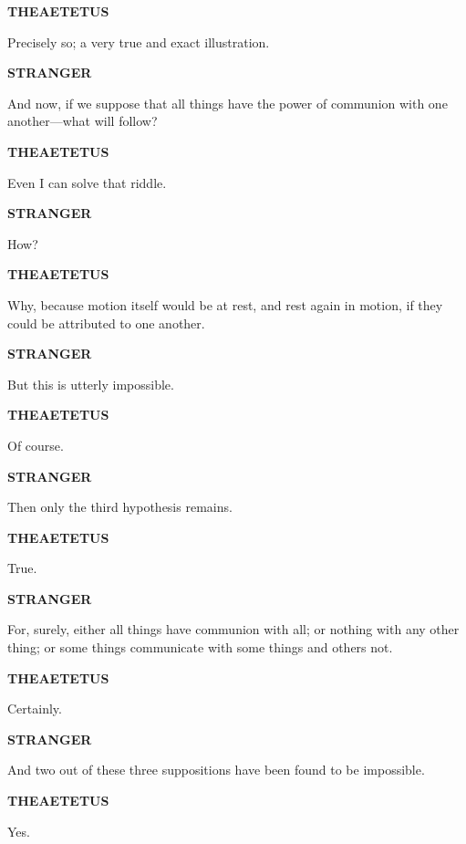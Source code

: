 \documentclass[11pt,letter]{article}
\begin{document}
\par \textbf{THEAETETUS}
\par   Precisely so; a very true and exact illustration.

\par \textbf{STRANGER}
\par   And now, if we suppose that all things have the power of communion with one another—what will follow?

\par \textbf{THEAETETUS}
\par   Even I can solve that riddle.

\par \textbf{STRANGER}
\par   How?

\par \textbf{THEAETETUS}
\par   Why, because motion itself would be at rest, and rest again in motion, if they could be attributed to one another.

\par \textbf{STRANGER}
\par   But this is utterly impossible.

\par \textbf{THEAETETUS}
\par   Of course.

\par \textbf{STRANGER}
\par   Then only the third hypothesis remains.

\par \textbf{THEAETETUS}
\par   True.

\par \textbf{STRANGER}
\par   For, surely, either all things have communion with all; or nothing with any other thing; or some things communicate with some things and others not.

\par \textbf{THEAETETUS}
\par   Certainly.

\par \textbf{STRANGER}
\par   And two out of these three suppositions have been found to be impossible.

\par \textbf{THEAETETUS}
\par   Yes.
\end{document}
